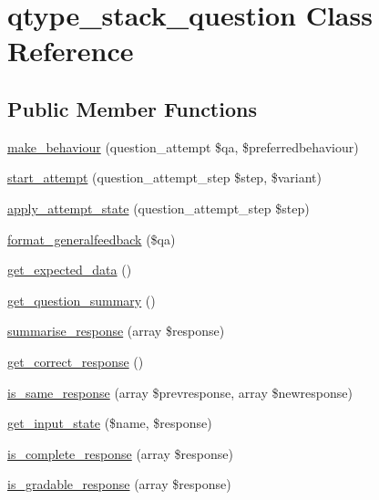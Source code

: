 \hypertarget{classqtype__stack__question}{
\section{qtype\_\-stack\_\-question Class Reference}
\label{classqtype__stack__question}
}
\subsection*{Public Member Functions}
\begin{DoxyCompactItemize}
\item 
\hyperlink{classqtype__stack__question_a6710a5a63ad311ca3c87618ffad2cb95}{make\_\-behaviour} (question\_\-attempt \$qa, \$preferredbehaviour)
\item 
\hyperlink{classqtype__stack__question_a99a663e62b22a8047beb740d24008cb9}{start\_\-attempt} (question\_\-attempt\_\-step \$step, \$variant)
\item 
\hyperlink{classqtype__stack__question_a41ebd81c094de17a8cc9deaef4d06fcc}{apply\_\-attempt\_\-state} (question\_\-attempt\_\-step \$step)
\item 
\hyperlink{classqtype__stack__question_a026f32da73f92f604833d001e33d3473}{format\_\-generalfeedback} (\$qa)
\item 
\hyperlink{classqtype__stack__question_ace8c6f36e84d6cc4b7107a4b76e305ea}{get\_\-expected\_\-data} ()
\item 
\hyperlink{classqtype__stack__question_a754e93fccfebf8e5019174322b4d9fcc}{get\_\-question\_\-summary} ()
\item 
\hyperlink{classqtype__stack__question_a56a30cee9eee5292377c3ab805e5a2b9}{summarise\_\-response} (array \$response)
\item 
\hyperlink{classqtype__stack__question_a92a9d2c3673c139ef09e9ecb08cd9f2e}{get\_\-correct\_\-response} ()
\item 
\hyperlink{classqtype__stack__question_abcb27429946edeb99bcd4706c49f4c4b}{is\_\-same\_\-response} (array \$prevresponse, array \$newresponse)
\item 
\hyperlink{classqtype__stack__question_ae4f0da0056f1478a8f2fd2c80d672ad4}{get\_\-input\_\-state} (\$name, \$response)
\item 
\hyperlink{classqtype__stack__question_ab80c2c47f43a1058c3e161c3f2cf424a}{is\_\-complete\_\-response} (array \$response)
\item 
\hyperlink{classqtype__stack__question_a8c49225da011449411661e2bdc698c43}{is\_\-gradable\_\-response} (array \$response)

\end{DoxyCompactItemize}
